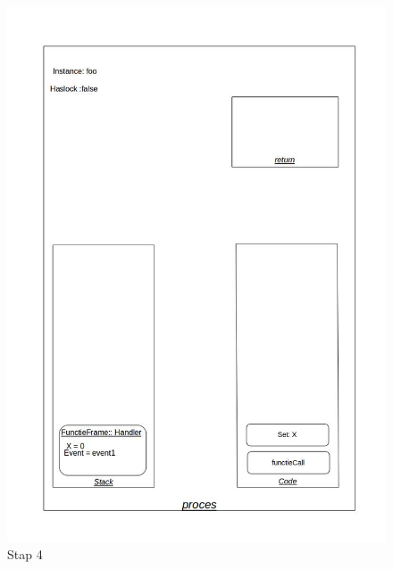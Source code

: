\documentclass[]{article}
\begin{document}
\begin{figure}[H]
\centering
\includegraphics[scale=0.4]{AnalyseADTAlgorithm/processtappen/stap4.jpg}
\caption{Stap 4}
\end{figure}
\end{document}
